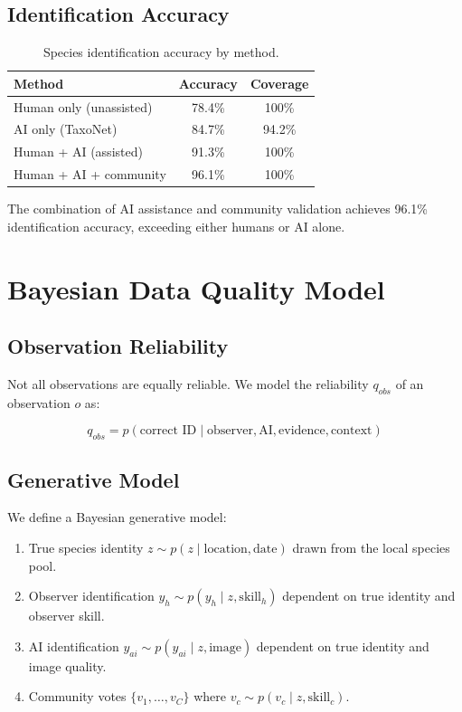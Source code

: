 \documentclass[11pt,a4paper]{article}
\begin{document}
\subsection{Identification Accuracy}

\begin{table}[H]
\centering
\caption{Species identification accuracy by method.}
\label{tab:id_accuracy}
\begin{tabular}{lcc}
\toprule
\textbf{Method} & \textbf{Accuracy} & \textbf{Coverage} \\
\midrule
Human only (unassisted) & 78.4\% & 100\% \\
AI only (TaxoNet) & 84.7\% & 94.2\% \\
Human + AI (assisted) & 91.3\% & 100\% \\
Human + AI + community & 96.1\% & 100\% \\
\bottomrule
\end{tabular}
\end{table}

The combination of AI assistance and community validation achieves
96.1\% identification accuracy, exceeding either humans or AI alone.


\section{Bayesian Data Quality Model}
\label{sec:quality}

\subsection{Observation Reliability}

Not all observations are equally reliable. We model the reliability
$q_{obs}$ of an observation $o$ as:

\begin{equation}
  q_{obs} = p(\text{correct ID} \mid \text{observer}, \text{AI},
  \text{evidence}, \text{context})
\end{equation}

\subsection{Generative Model}

We define a Bayesian generative model:

\begin{enumerate}
  \item True species identity $z \sim p(z \mid \text{location}, \text{date})$
    drawn from the local species pool.
  \item Observer identification $y_h \sim p(y_h \mid z, \text{skill}_h)$
    dependent on true identity and observer skill.
  \item AI identification $y_{ai} \sim p(y_{ai} \mid z, \text{image})$
    dependent on true identity and image quality.
  \item Community votes $\{v_1, \ldots, v_C\}$ where
    $v_c \sim p(v_c \mid z, \text{skill}_c)$.
\end{enumerate}
\end{document}
